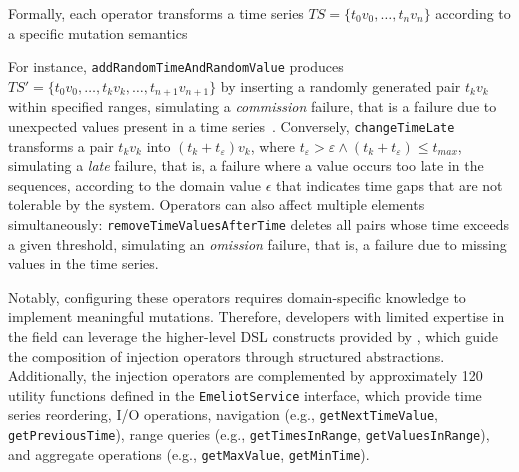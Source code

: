 Formally, each operator transforms a time series $TS = \{t_0 v_0, \ldots, t_n v_n\}$ according to a specific mutation semantics%

For instance, \texttt{addRandomTimeAndRandomValue} produces $TS' = \{t_0 v_0, \ldots, t_k v_k, \ldots, t_{n+1} v_{n+1}\}$ by inserting a randomly generated pair $t_k v_k$  within specified ranges, simulating a \textit{commission} failure, that is a failure due to unexpected values present in a time series~\citep{10350526}. Conversely, \texttt{changeTimeLate} transforms a pair $t_k v_k$ into $(t_k + t_\varepsilon) v_k$, where $t_\varepsilon > \varepsilon \land (t_k + t_\varepsilon) \leq t_{max}$, simulating a \textit{late} failure, that is, a failure where a value occurs too late in the sequences, according to the domain value $\epsilon$ that indicates time gaps that are not tolerable by the system. Operators can also affect multiple elements simultaneously: \texttt{removeTimeValuesAfterTime} deletes all pairs whose time exceeds a given threshold, simulating an \textit{omission} failure, that is, a failure due to missing values in the time series. %

Notably, configuring these operators requires domain-specific knowledge to implement meaningful mutations. Therefore, developers with limited expertise in the field can leverage the higher-level DSL constructs provided by \tool, which guide the composition of injection operators through structured abstractions.
Additionally, the injection operators are complemented by approximately 120 utility functions defined in the \texttt{EmeliotService} interface, which provide time series reordering, I/O operations, navigation (e.g., \texttt{getNextTimeValue}, \texttt{getPreviousTime}), range queries (e.g., \texttt{getTimesInRange}, \texttt{getValuesInRange}), and aggregate operations (e.g., \texttt{getMaxValue}, \texttt{getMinTime}).

